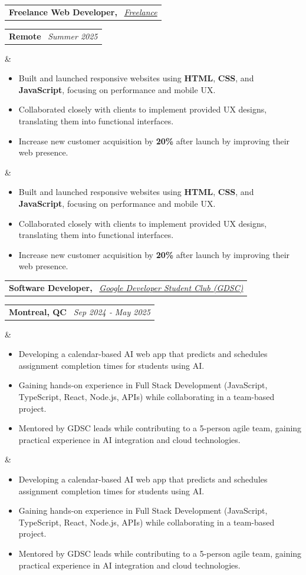 \documentclass[10pt,a4paper,sans]{moderncv}
\makeatletter
\newcommand*{\customcventry}[7][.13em]{
\begin{tabular}{@{}l}
{\bfseries #4} \
{\itshape #3}
\end{tabular}
\hfill
\begin{tabular}{l@{}}
{\bfseries #5} \
{\itshape #2}
\end{tabular}
\ifx&#7&%
\else
{%
\begin{minipage}{\maincolumnwidth}%
\raggedright
#7%
\end{minipage}%
}%
\fi
\par\addvspace{#1}}
\makeatother
\begin{document}
\customcventry{Summer 2025}{{\color{blue}\href{https://webgenweb.netlify.app/}{Freelance}}}{Freelance Web Developer,}{Remote}{}{
\renewcommand{\labelitemi}{\textbullet}
\begin{itemize} \itemsep -2pt
  \item Built and launched responsive websites using \textbf{HTML}, \textbf{CSS}, and \textbf{JavaScript}, focusing on performance and mobile UX.
  \item Collaborated closely with clients to implement provided UX designs, translating them into functional interfaces.
  \item Increase new customer acquisition by \textbf{20\%} after launch by improving their web presence.
 \linebreak
\end{itemize}
}











\customcventry{Sep 2024 ‐ May 2025}{{\color{blue}\href{https://gdg.community.dev/}{Google Developer Student Club (GDSC)}}}{Software Developer,}{Montreal, QC}{}{
\renewcommand{\labelitemi}{\textbullet} %
\begin{itemize} \itemsep -2pt %
    \item Developing a calendar-based AI web app that predicts and schedules assignment completion times for students using AI.
    \item Gaining hands-on experience in Full Stack Development (JavaScript, TypeScript, React, Node.js, APIs) while collaborating in a team-based project.
    \item Mentored by GDSC leads while contributing to a 5-person agile team, gaining practical experience in AI integration and cloud technologies.\linebreak
\end{itemize}
}
\end{document}
